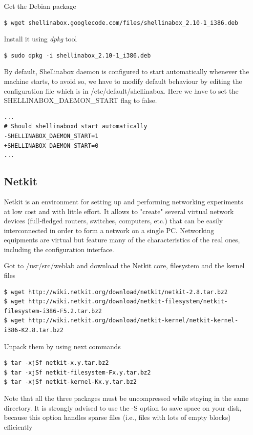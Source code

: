\documentclass{article}
\begin{document}
Get the Debian package

\begin{verbatim}
$ wget shellinabox.googlecode.com/files/shellinabox_2.10-1_i386.deb
\end{verbatim}

Install it using \textit{dpkg} tool
\begin{verbatim}
$ sudo dpkg -i shellinabox_2.10-1_i386.deb
\end{verbatim}

By default, Shellinabox daemon is configured to start automatically whenever the machine starts, to avoid so, we have to modify default behaviour by editing the configuration file which is in /etc/default/shellinabox. Here we have to set the SHELLINABOX\_DAEMON\_START flag to false.

\begin{verbatim}
...
# Should shellinaboxd start automatically
-SHELLINABOX_DAEMON_START=1
+SHELLINABOX_DAEMON_START=0
...
\end{verbatim}

\subsection{Netkit}
Netkit is an environment for setting up and performing networking experiments at low cost and with little effort. It allows to "create" several virtual network devices (full-fledged routers, switches, computers, etc.) that can be easily interconnected in order to form a network on a single PC. Networking equipments are virtual but feature many of the characteristics of the real ones, including the configuration interface.

Got to /usr/src/weblab and download the Netkit core, filesystem and the kernel files
\begin{verbatim}
$ wget http://wiki.netkit.org/download/netkit/netkit-2.8.tar.bz2
$ wget http://wiki.netkit.org/download/netkit-filesystem/netkit-filesystem-i386-F5.2.tar.bz2
$ wget http://wiki.netkit.org/download/netkit-kernel/netkit-kernel-i386-K2.8.tar.bz2
\end{verbatim}

Unpack them by using next commands
\begin{verbatim}
$ tar -xjSf netkit-x.y.tar.bz2
$ tar -xjSf netkit-filesystem-Fx.y.tar.bz2
$ tar -xjSf netkit-kernel-Kx.y.tar.bz2
\end{verbatim}

Note that all the three packages must be uncompressed while staying in the same directory. It is strongly advised to use the -S option to save space on your disk, because this option handles sparse files (i.e., files with lots of empty blocks) efficiently
\end{document}
